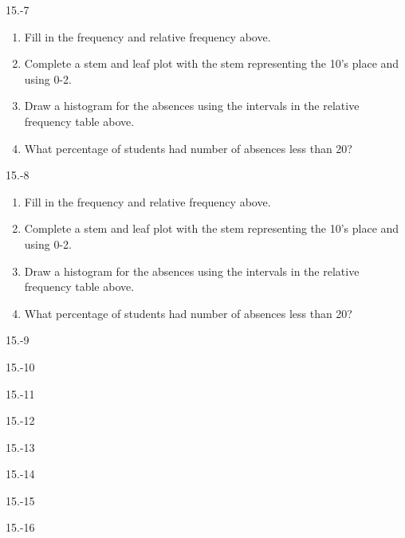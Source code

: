 \begin{exsol@solution}{15.-7}
\begin{enumerate}
  \item	Fill in the frequency and relative frequency above.
  \item	Complete a stem and leaf plot with the stem representing the 10's place and using 0-2.
  \item	Draw a histogram for the absences using the intervals in the relative frequency table above.
  \item	What percentage of students had number of absences less than 20?
\end{enumerate}

\end{exsol@solution}
\begin{exsol@solution}{15.-8}
\begin{enumerate}
  \item	Fill in the frequency and relative frequency above.
  \item	Complete a stem and leaf plot with the stem representing the 10's place and using 0-2.
  \item	Draw a histogram for the absences using the intervals in the relative frequency table above.
  \item	What percentage of students had number of absences less than 20?
\end{enumerate}

\end{exsol@solution}
\begin{exsol@solution}{15.-9}
\end{exsol@solution}
\begin{exsol@solution}{15.-10}
\end{exsol@solution}
\begin{exsol@solution}{15.-11}
\end{exsol@solution}
\begin{exsol@solution}{15.-12}
\end{exsol@solution}
\begin{exsol@solution}{15.-13}
\end{exsol@solution}
\begin{exsol@solution}{15.-14}
\end{exsol@solution}
\begin{exsol@solution}{15.-15}
\end{exsol@solution}
\begin{exsol@solution}{15.-16}
\end{exsol@solution}
